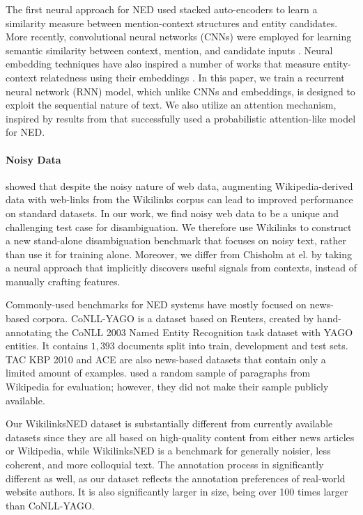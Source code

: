 \documentclass[11pt,letterpaper]{article}
\begin{document}
	The first neural approach for NED \cite{he2013learning} used stacked auto-encoders to learn a similarity measure between mention-context structures and entity candidates. More recently, convolutional neural networks (CNNs) were employed for learning semantic similarity between context, mention, and candidate inputs \cite{sun2015modeling,francis2016capturing}. Neural embedding techniques have also inspired a number of works that measure entity-context relatedness using their embeddings \cite{yamada2016joint,Hu2015Entity}. In this paper, we train a recurrent neural network (RNN) model, which unlike CNNs and embeddings, is designed to exploit the sequential nature of text. We also utilize an attention mechanism, inspired by results from  that successfully used a probabilistic attention-like model for NED.
	
	\paragraph{Noisy Data}
	
	 showed that despite the noisy nature of web data, augmenting Wikipedia-derived data with web-links from the Wikilinks corpus \cite{singh12:wiki-links} can lead to improved performance on standard datasets. 
	In our work, we find noisy web data to be a unique and challenging test case for disambiguation. We therefore use Wikilinks to construct a new stand-alone disambiguation benchmark that focuses on noisy text, rather than use it for training alone. 
	Moreover, we differ from Chisholm at el. by taking a neural approach that implicitly discovers useful signals from contexts, instead of manually crafting features.
	
	Commonly-used benchmarks for NED systems have mostly focused on news-based corpora. CoNLL-YAGO \cite{hoffart2011robust} is a dataset based on Reuters, created by hand-annotating the CoNLL 2003 Named Entity Recognition task dataset with YAGO \cite{suchanek2007} entities. It contains $1,393$ documents split into train, development and test sets. TAC KBP 2010 \cite{ji2010overview} and ACE  are also news-based datasets that contain only a limited amount of examples.  used a random sample of paragraphs from Wikipedia for evaluation; however, they did not make their sample publicly available.
	
	Our WikilinksNED dataset is substantially different from currently available datasets since they are all based on high-quality content from either news articles or Wikipedia, while WikilinksNED is a benchmark for generally noisier, less coherent, and more colloquial text. The annotation process in significantly different as well, as our dataset reflects the annotation preferences of real-world website authors. It is also significantly larger in size, being over 100 times larger than CoNLL-YAGO.
	
\end{document}
